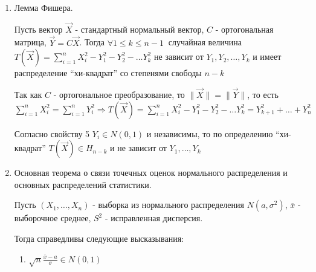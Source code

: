 \documentclass[12pt]{article}
\begin{document}
\begin{enumerate}
\begin{enumerate}
        \item $\letsymbol$ случайный вектор $\xi \in N(\vec a, K)$.
        Тогда его координаты независимы тогда и только тогда, когда они не коррелированы (то есть матрица ковариаций $K$ диагональная)

        \underline{Следствие}. Если плотность совместного распределения случайных величин $\xi$ и $\eta$ ненулевая, то они независимы тогда и только тогда, 
        когда их коэффициент корреляции равен нулю
    \end{enumerate}

    \item Лемма Фишера.

    \begin{MyTheorem}
         Пусть вектор $\vec X$ - стандартный нормальный вектор, $C$ - ортогональная матрица, $\vec Y = C \vec X$.
        Тогда $\forall 1 \leq k \leq n - 1 \ $ случайная величина $T(\vec X) = \sum_{i = 1}^n X_i^2 - Y_1^2 - Y_2^2 - \dots Y_k^2$ 
        не зависит от $Y_1, Y_2, \dots, Y_k$ и имеет распределение \enquote{хи-квадрат} со степенями свободы $n - k$
    \end{MyTheorem}

    \begin{MyProof}
        Так как $C$ - ортогональное преобразование, то $\|\vec X\| = \|\vec Y\|$, то есть $\sum_{i = 1}^n X^2_i = \sum_{i = 1}^n Y^2_i \Longrightarrow
        T(\vec X) = \sum_{i = 1}^n X_i^2 - Y_1^2 - Y_2^2 - \dots Y_k^2 = Y^2_{k + 1} + \dots + Y^2_{n}$

        Согласно свойству 5 $Y_i \in N(0, 1)$ и независимы, то по определению \enquote{хи-квадрат} $T(\vec X) \in H_{n - k}$ и не зависит от $Y_1, \dots, Y_k$
    \end{MyProof}

    \item Основная теорема о связи точечных оценок нормального распределения и основных распределений статистики.

    \begin{MyTheorem}
        \Ths Пусть $(X_1, \dots, X_n)$ - выборка из нормального распределения $N(a, \sigma^2)$, $\overline{x}$ - выборочное среднее, $S^2$ - исправленная дисперсия.

        Тогда справедливы следующие высказывания:

        \begin{enumerate}
            \item $\sqrt{n} \frac{\overline{x} - a}{\sigma} \in N(0, 1)$
            

\end{enumerate}
\end{MyTheorem}
\end{enumerate}
\end{document}
